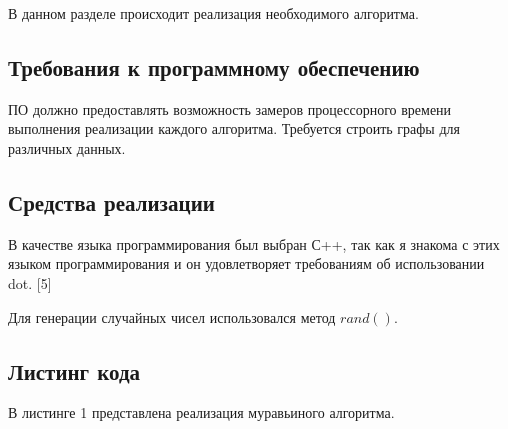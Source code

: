 \documentclass[a4paper,14pt]{article} %
\begin{document}
        В данном разделе происходит реализация необходимого алгоритма. 
        
         \subsection{Требования к программному обеспечению}
        \hfill
        
        ПО должно предоставлять возможность замеров процессорного времени выполнения реализации каждого алгоритма. Требуется строить графы для различных данных.
        \hfill

        
        \subsection{Средства реализации}
        \hfill
        
        В качестве языка программирования был выбран С++, так как я знакома с этих языком программирования и он удовлетворяет требованиям об использовании dot. [5]
        \hfill
        
        Для генерации случайных чисел использовался метод $rand()$. 
        
        \subsection{Листинг кода}
        \hfill
        
        В листинге 1 представлена реализация муравьиного алгоритма. 
        
\end{document}
